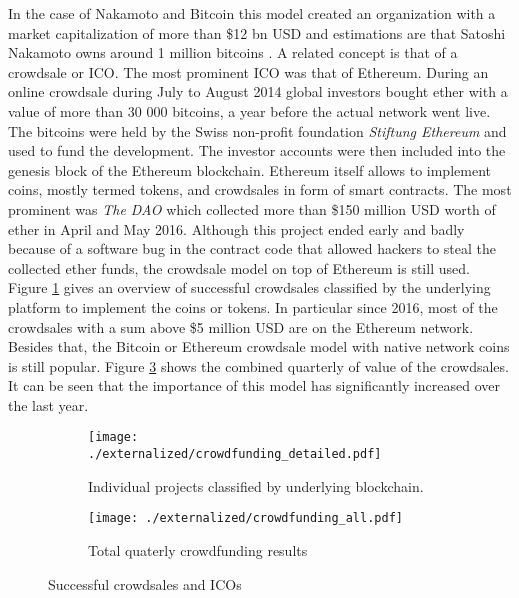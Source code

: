 In the case of Nakamoto and Bitcoin this model created an organization with a market capitalization of more than \$12 bn USD and estimations are that Satoshi Nakamoto owns around 1 million bitcoins \parencite{Lerner2016}. A related concept is that of a crowdsale or \ac{ICO}. The most prominent \ac{ICO} was that of Ethereum. During an online crowdsale during July to August 2014 global investors bought ether with a value of more than 30 000 bitcoins, a year before the actual network went live. The bitcoins were held by the Swiss non-profit foundation \emph{Stiftung Ethereum} and used to fund the development. The investor accounts were then included into the genesis block of the Ethereum blockchain. Ethereum itself allows to implement coins, mostly termed tokens, and crowdsales in form of smart contracts. The most prominent was \emph{The DAO} which collected more than \$150 million USD worth of ether in April and May 2016. Although this project ended early and badly because of a software bug in the contract code that allowed hackers to steal the collected ether funds, the crowdsale model on top of Ethereum is still used. Figure \ref{fig:eco:crowdfunding_detailed} gives an overview of successful crowdsales classified by the underlying platform to implement the coins or tokens. In particular since 2016, most of the crowdsales with a sum above \$5 million USD are on the Ethereum network. Besides that, the Bitcoin or Ethereum crowdsale model with native network coins is still popular. Figure \ref{fig:eco:crowdfunding_all} shows the combined quarterly of value of the crowdsales. It can be seen that the importance of this model has significantly increased over the last year. 

\begin{figure}[ht]
  \centering
  \begin{subfigure}[t]{0.45\linewidth}
    \centering\texttt{[image: ./externalized/crowdfunding\_detailed.pdf]}
    \caption{Individual projects classified by underlying blockchain.}
    \label{fig:eco:crowdfunding_detailed}
  \end{subfigure}%
  \begin{subfigure}[t]{0.45\linewidth}
    \centering\texttt{[image: ./externalized/crowdfunding\_all.pdf]}
    \caption{Total quaterly crowdfunding results}
    \label{fig:eco:crowdfunding_all}
  \end{subfigure}
  \caption{Successful crowdsales and \ac{ICO}s}
\end{figure}

